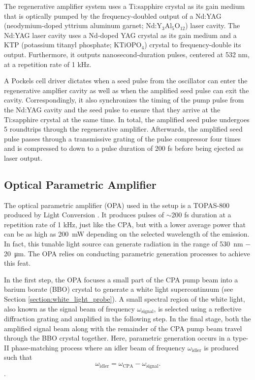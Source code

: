 The regenerative amplifier system uses a Ti:sapphire crystal as its gain medium that is optically pumped by the frequency-doubled output of a Nd:YAG (neodymium-doped yttrium aluminum garnet; Nd:Y$_3$Al$_5$O$_{12}$) laser cavity. The Nd:YAG laser cavity uses a Nd-doped YAG crystal as its gain medium and a KTP (potassium titanyl phosphate; KTiOPO$_4$) crystal to frequency-double its output. Furthermore, it outputs nanosecond-duration pulses, centered at 532 nm, at a repetition rate of 1 kHz.

A Pockels cell driver dictates when a seed pulse from the oscillator can enter the regenerative amplfier cavity as well as when the amplified seed pulse can exit the cavity. Correspondingly, it also synchronizes the timing of the pump pulse from the Nd:YAG cavity and the seed pulse to ensure that they arrive at the Ti:sapphire crystal at the same time. In total, the amplified seed pulse undergoes 5 roundtrips through the regenerative amplifier. Afterwards, the amplified seed pulse passes through a transmissive grating of the pulse compressor four times and is compressed to down to a pulse duration of 200 fs before being ejected as laser output.

\subsection{Optical Parametric Amplifier}
\label{section:opa}

The optical parametric amplifier (OPA) used in the setup is a TOPAS-800 produced by Light Conversion \cite{topas}. It produces pulses of $\sim$200 fs duration at a repetition rate of 1 kHz, just like the CPA, but with a lower average power that can be as high as \SI{200}{\milli\watt} depending on the selected wavelength of the emission. In fact, this tunable light source can generate radiation in the range of \SI{530}{\nano\meter} $-$ \SI{20}{\micro\meter}. The OPA relies on conducting parametric generation processes to achieve this feat.

In the first step, the OPA focuses a small part of the CPA pump beam into a barium borate (BBO) crystal to generate a white light supercontinuum (see Section \ref{section:white_light_probe}). A small spectral region of the white light, also known as the signal beam of frequency $\omega_\text{signal}$, is selected using a reflective diffraction grating and amplified in the following step. In the final stage, both the amplified signal beam along with the remainder of the CPA pump beam travel through the BBO crystal together. Here, parametric generation occurs in a type-II phase-matching process where an idler beam of frequency $\omega_\text{idler}$ is produced such that
\begin{equation}
	\omega_\text{idler} = \omega_\text{CPA} - \omega_\text{signal}.
\end{equation}
\cite{dunn1999parametric, boyd2003nonlinear}.

